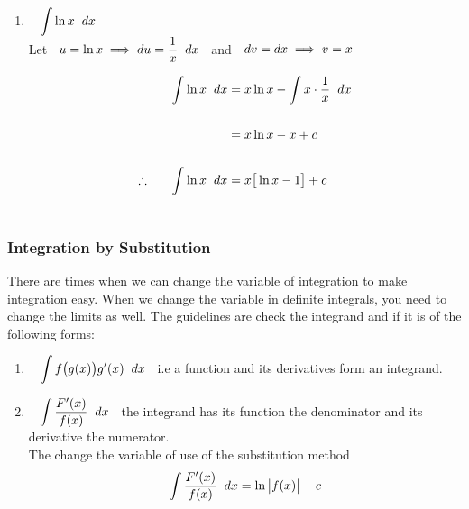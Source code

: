 \documentclass[11pt,a4paper]{article}
\begin{document}
\begin{enumerate}
\item $\hspace{0.3cm}\displaystyle{\int \ln x\hspace{0.2cm}dx}$\\

Let $\hspace{0.2cm} u = \ln x \implies du = \dfrac{1}{x}\hspace{0.2cm}dx\hspace{0.2cm}$ and $\hspace{0.2cm} dv = dx \implies v = x$

\begin{align*}
\int \ln x\hspace{0.2cm}dx & = x\ln x - \int x\cdot \dfrac{1}{x}\hspace{0.2cm}dx\\\\
& = x\ln x - x + c\\\\
\therefore\hspace{0.6cm}\int \ln x\hspace{0.2cm}dx &  = x \big[\ln x - 1\big] + c\\\\
\end{align*}
\end{enumerate}








\subsubsection{Integration by Substitution}
There are times when we can change the variable of integration to make integration easy. When we change the variable in definite integrals, you need to change the limits as well. The guidelines are check the integrand and if it is of the following forms:
\begin{enumerate}
\item $\hspace{0.3cm}\displaystyle{\int f\big(g(x)\big)g'(x)\hspace{0.2cm}dx\hspace{0.2cm}}$ i.e a function and its derivatives form an integrand.\\

\item $\hspace{0.3cm}\displaystyle{\int\dfrac{F'(x)}{f(x)}\hspace{0.2cm}dx\hspace{0.2cm}}$ the integrand has its function the denominator and its derivative the numerator.\\

The change the variable of use of the substitution method $$\int \dfrac{F'(x)}{f(x)}\hspace{0.2cm}dx = \ln \begin{vmatrix}
f(x)\\
\end{vmatrix} + c$$\\
\end{enumerate}
\end{document}
